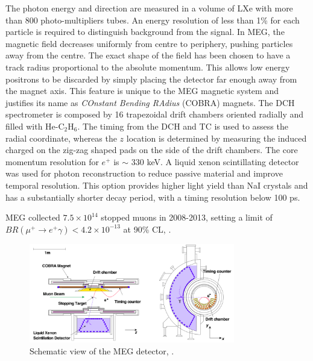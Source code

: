 The photon energy and direction are measured in a volume of LXe with more than 800 photo-multipliers tubes. 
An energy resolution of less than 1\% for each particle is required to distinguish background from the signal. 
In MEG, the magnetic field decreases uniformly from centre to periphery, pushing particles away from the centre. 
The exact shape of the field has been chosen to have a track radius proportional to the absolute momentum.
This allows low energy positrons to be discarded by simply placing the detector far enough away from the magnet axis. 
This feature is unique to the MEG magnetic system and justifies its name as \textit{COnstant Bending RAdius} (COBRA) magnets.
The DCH spectrometer is composed by 16 trapezoidal drift chambers oriented radially and filled with He-C$_2$H$_6$. 
The timing from the DCH and TC is used to assess the radial coordinate, whereas the $z$ location is determined by measuring the induced
charged on the zig-zag shaped pads on the side of the drift chambers. The core momentum resolution for $e^+$ is $\sim$ 330 keV.
A liquid xenon scintillating detector was used for photon reconstruction to reduce passive material and improve temporal resolution. 
This option provides higher light yield than NaI crystals 
and has a substantially shorter decay period, with a timing resolution below 100 ps.

MEG collected $7.5 \times 10^{14}$ stopped muons in 2008-2013, 
setting a limit of $BR(\mu^+ \rightarrow e^+ \gamma) < 4.2 \times 10^{-13}$ at 90\% CL, \cite{megi}.
\begin{figure}[!h]
\centering
\includegraphics[width =0.8\textwidth]{figures/png/Screenshot_20240321_115127.png}
\caption[MEG detector.]{Schematic view of the MEG detector, \cite{megi}.}
\label{fig:meg}
\end{figure}
